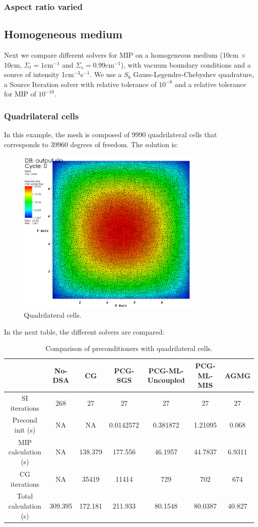 \subsubsection{Aspect ratio varied}

\subsection{Homogeneous medium}
Next we compare different solvers for MIP on a homogeneous medium (10cm $\times$
10cm, $\Sigma_t=1$cm$^{-1}$ and $\Sigma_s=0.99$cm$^{-1}$), with vacuum boundary 
conditions and a source of intensity 1cm$^{-3}$s$^{-1}$. We use a $S_8$
Gauss-Legendre-Chebyshev quadrature, a Source Iteration solver with relative
tolerance of $10^{-8}$ and a relative tolerance for MIP of $10^{-10}$.
\subsubsection{Quadrilateral cells}
In this example, the mesh is composed of 9990 quadrilateral cells that corresponds 
to 39960 degrees of freedom. The solution is:
\begin{figure}[H]
\centering
\includegraphics[width=0.8\textwidth]{homog_quad_crop}
\caption{Quadrilateral cells.}
\end{figure}
In the next table, the different solvers are compared:
\begin{table}[H]
\begin{center}
\begin{tabular}{|c|c|c|c|c|c|c|}
\hline
 & No-DSA & CG & PCG-SGS & PCG-ML-Uncoupled & PCG-ML-MIS & AGMG\\
\hline
SI iterations & 268 & 27 & 27 & 27 & 27 & 27 \\
Precond init (s) & NA & NA & 0.0142572 & 0.381872 & 1.21095 & 0.068\\
MIP calculation (s) & NA & 138.379 & 177.556 & 46.1957 & 44.7837 & 6.9311\\
CG iterations & NA & 35419 & 11414 & 729 & 702 & 674\\
Total calculation (s) & 309.395 & 172.181 & 211.933 & 80.1548 & 80.0387 &
40.827\\
\hline
\end{tabular}
\caption{Comparison of preconditioners with quadrilateral cells.}
\end{center}
\end{table}
